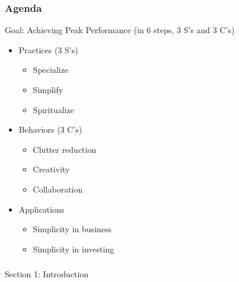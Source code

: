 \begin{frame}[fragile]\frametitle{Agenda}

Goal: Achieving Peak Performance (in 6 steps, 3 S's and 3 C's)

\begin{itemize}
\item Practices (3 S's)
	\begin{itemize}
	\item Specialize
	\item Simplify
	\item Spiritualize
	\end{itemize}

\item Behaviors (3 C's)
	\begin{itemize}
	\item Clutter reduction
	\item Creativity
	\item Collaboration
	\end{itemize}
	
\item Applications
	\begin{itemize}
	\item Simplicity in business
	\item Simplicity in investing
	\end{itemize}	
\end{itemize}

\end{frame}

\begin{frame}[fragile]\frametitle{}
\begin{center}
{\Large Section 1: Introduction}

\end{center}
\end{frame}

